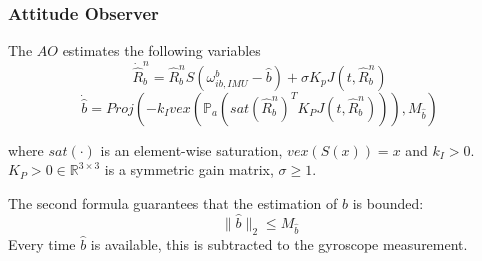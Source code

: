 \documentclass{beamer}
\begin{document}
    \begin{frame}
        \frametitle{Attitude Observer}
    The $AO$ estimates the following variables    
        \[ \dot{\hat{R}}^n_b  =  \hat{R}^n_b S(\omega^b_{ib,IMU} - \hat{b}) + \sigma K_pJ(t, \hat{R}^n_b) \]      
        \[ \dot{\hat{b}} = Proj(-k_I vex(\mathds{P}_a (sat(\hat{R}^n_b)^T K_P J(t, \hat{R}^n_b))),M_{\hat{b}} )\]
        
        where $sat(\cdot)$ is an element-wise saturation, $vex(S(x)) = x$ and $k_I > 0$. $K_P > 0 \in \mathds{R}^{3\times 3}$ is a symmetric gain matrix, $\sigma \geq 1$.
       
        The second formula guarantees that the estimation of $b$ is bounded: 
        \[\|\hat{b} \|_2 \leqslant M_{\hat{b}} \]
        Every time $\hat{b}$ is available, this is subtracted to the gyroscope measurement.
        
    \end{frame}
    
		
		
		



		
		
\end{document}
